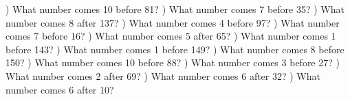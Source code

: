 \documentclass{article}%
\begin{document}
) What number comes 10 before 81?%
\newline%
\newline%
) What number comes 7 before 35?%
\newline%
\newline%
) What number comes 8 after 137?%
\newline%
\newline%
) What number comes 4 before 97?%
\newline%
\newline%
) What number comes 7 before 16?%
\newline%
\newline%
) What number comes 5 after 65?%
\newline%
\newline%
) What number comes 1 before 143?%
\newline%
\newline%
) What number comes 1 before 149?%
\newline%
\newline%
) What number comes 8 before 150?%
\newline%
\newline%
) What number comes 10 before 88?%
\newline%
\newline%
) What number comes 3 before 27?%
\newline%
\newline%
) What number comes 2 after 69?%
\newline%
\newline%
) What number comes 6 after 32?%
\newline%
\newline%
) What number comes 6 after 10?%
\newline%
\newline%
\newline%
\end{document}
